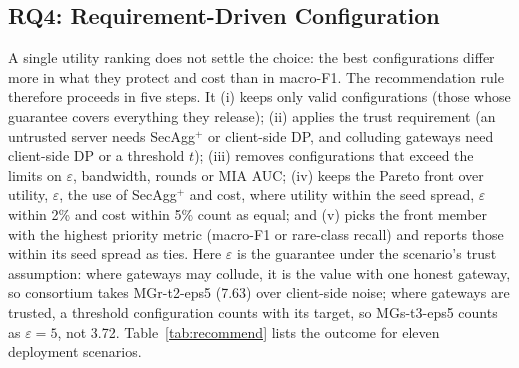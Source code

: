 \documentclass[conference]{IEEEtran}
\begin{document}
\subsection{RQ4: Requirement-Driven Configuration}\label{subsec:rq4}
A single utility ranking does not settle the choice: the best configurations differ more in what they protect and cost than in macro-F1. The recommendation rule therefore proceeds in five steps. It (i) keeps only valid configurations (those whose guarantee covers everything they release); (ii) applies the trust requirement (an untrusted server needs SecAgg$^+$ or client-side DP, and colluding gateways need client-side DP or a threshold $t$); (iii) removes configurations that exceed the limits on $\varepsilon$, bandwidth, rounds or MIA AUC; (iv) keeps the Pareto front over utility, $\varepsilon$, the use of SecAgg$^+$ and cost, where utility within the seed spread, $\varepsilon$ within 2\% and cost within 5\% count as equal; and (v) picks the front member with the highest priority metric (macro-F1 or rare-class recall) and reports those within its seed spread as ties. Here $\varepsilon$ is the guarantee under the scenario's trust assumption: where gateways may collude, it is the value with one honest gateway, so consortium takes MGr-t2-eps5 (7.63) over client-side noise; where gateways are trusted, a threshold configuration counts with its target, so MGs-t3-eps5 counts as $\varepsilon = 5$, not 3.72. Table~\ref{tab:recommend} lists the outcome for eleven deployment scenarios.
\end{document}
